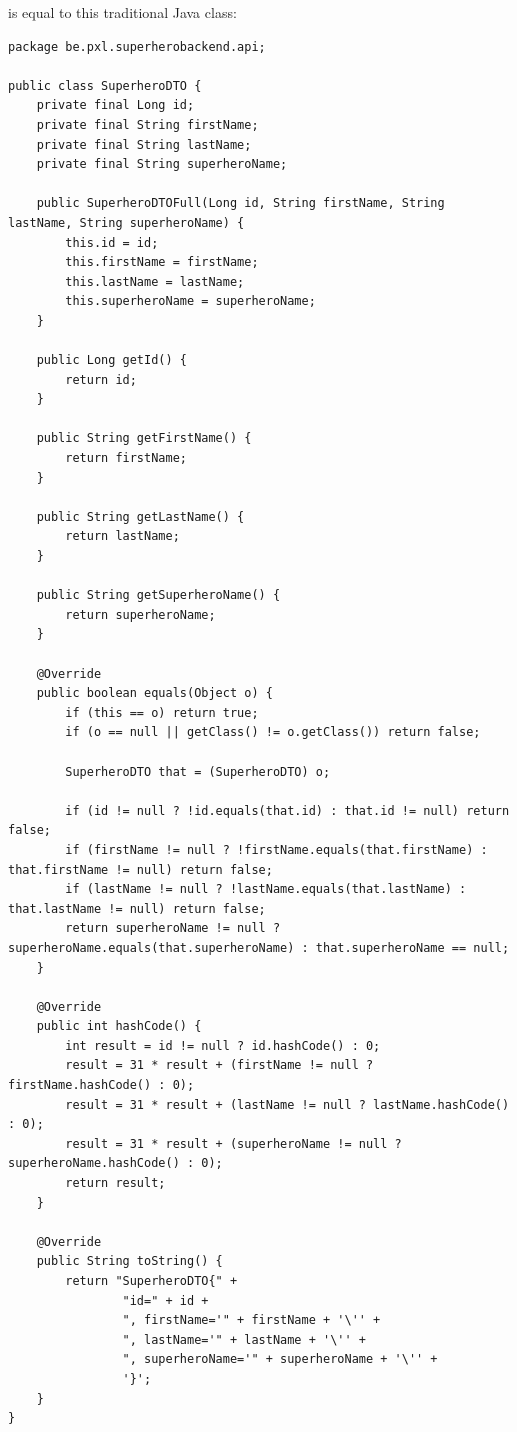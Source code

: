 \documentclass[a4paper, 12pt]{report}
\begin{document}
is equal to this traditional Java class:

\begin{lstlisting}
package be.pxl.superherobackend.api;

public class SuperheroDTO {
    private final Long id;
    private final String firstName;
    private final String lastName;
    private final String superheroName;

    public SuperheroDTOFull(Long id, String firstName, String lastName, String superheroName) {
        this.id = id;
        this.firstName = firstName;
        this.lastName = lastName;
        this.superheroName = superheroName;
    }

    public Long getId() {
        return id;
    }

    public String getFirstName() {
        return firstName;
    }

    public String getLastName() {
        return lastName;
    }

    public String getSuperheroName() {
        return superheroName;
    }

    @Override
    public boolean equals(Object o) {
        if (this == o) return true;
        if (o == null || getClass() != o.getClass()) return false;

        SuperheroDTO that = (SuperheroDTO) o;

        if (id != null ? !id.equals(that.id) : that.id != null) return false;
        if (firstName != null ? !firstName.equals(that.firstName) : that.firstName != null) return false;
        if (lastName != null ? !lastName.equals(that.lastName) : that.lastName != null) return false;
        return superheroName != null ? superheroName.equals(that.superheroName) : that.superheroName == null;
    }

    @Override
    public int hashCode() {
        int result = id != null ? id.hashCode() : 0;
        result = 31 * result + (firstName != null ? firstName.hashCode() : 0);
        result = 31 * result + (lastName != null ? lastName.hashCode() : 0);
        result = 31 * result + (superheroName != null ? superheroName.hashCode() : 0);
        return result;
    }

    @Override
    public String toString() {
        return "SuperheroDTO{" +
                "id=" + id +
                ", firstName='" + firstName + '\'' +
                ", lastName='" + lastName + '\'' +
                ", superheroName='" + superheroName + '\'' +
                '}';
    }
}

\end{lstlisting}
\end{document}
